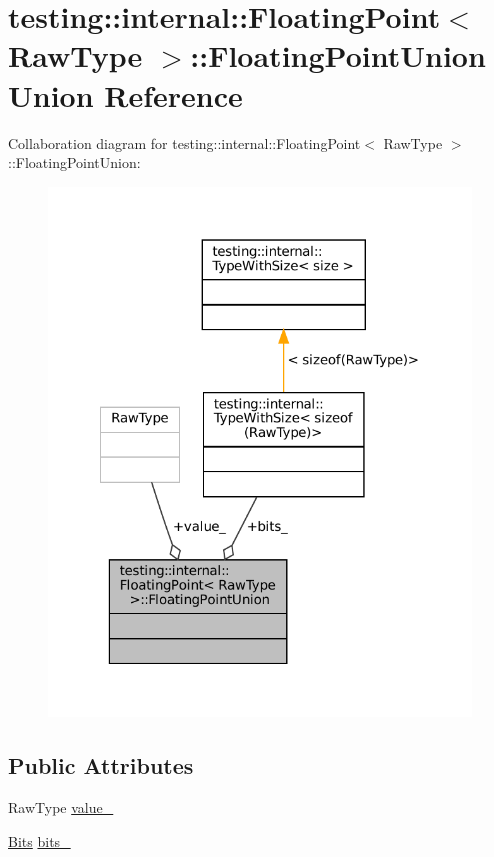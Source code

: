 \hypertarget{uniontesting_1_1internal_1_1FloatingPoint_1_1FloatingPointUnion}{}\section{testing\+:\+:internal\+:\+:Floating\+Point$<$ Raw\+Type $>$\+:\+:Floating\+Point\+Union Union Reference}
\label{uniontesting_1_1internal_1_1FloatingPoint_1_1FloatingPointUnion}


Collaboration diagram for testing\+:\+:internal\+:\+:Floating\+Point$<$ Raw\+Type $>$\+:\+:Floating\+Point\+Union\+:
\nopagebreak
\begin{figure}[H]
\begin{center}
\leavevmode
\includegraphics[width=322pt]{uniontesting_1_1internal_1_1FloatingPoint_1_1FloatingPointUnion__coll__graph}
\end{center}
\end{figure}
\subsection*{Public Attributes}
\begin{DoxyCompactItemize}
\item 
Raw\+Type \hyperlink{uniontesting_1_1internal_1_1FloatingPoint_1_1FloatingPointUnion_a4ee324889f70577721393e8e1920e4c6}{value\+\_\+}
\item 
\hyperlink{classtesting_1_1internal_1_1FloatingPoint_abf228bf6cd48f12c8b44c85b4971a731}{Bits} \hyperlink{uniontesting_1_1internal_1_1FloatingPoint_1_1FloatingPointUnion_aedb69e386f5d624a016f7a781302a2bf}{bits\+\_\+}
\end{DoxyCompactItemize}


